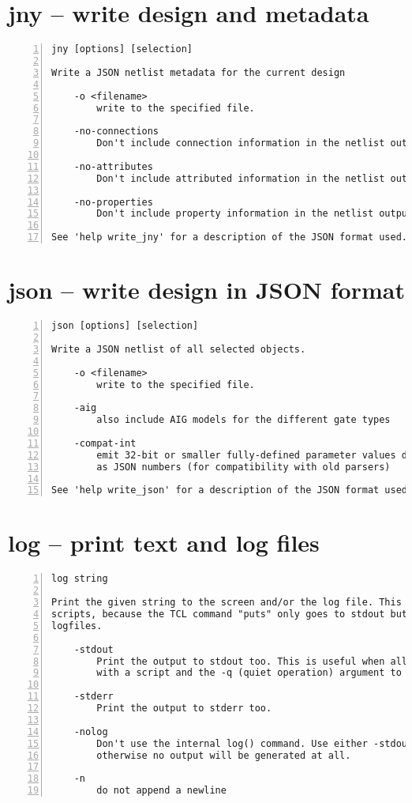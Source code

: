 \section{jny -- write design and metadata}
\label{cmd:jny}
\begin{lstlisting}[numbers=left,frame=single]
    jny [options] [selection]

Write a JSON netlist metadata for the current design

    -o <filename>
        write to the specified file.

    -no-connections
        Don't include connection information in the netlist output.

    -no-attributes
        Don't include attributed information in the netlist output.

    -no-properties
        Don't include property information in the netlist output.

See 'help write_jny' for a description of the JSON format used.
\end{lstlisting}

\section{json -- write design in JSON format}
\label{cmd:json}
\begin{lstlisting}[numbers=left,frame=single]
    json [options] [selection]

Write a JSON netlist of all selected objects.

    -o <filename>
        write to the specified file.

    -aig
        also include AIG models for the different gate types

    -compat-int
        emit 32-bit or smaller fully-defined parameter values directly
        as JSON numbers (for compatibility with old parsers)

See 'help write_json' for a description of the JSON format used.
\end{lstlisting}

\section{log -- print text and log files}
\label{cmd:log}
\begin{lstlisting}[numbers=left,frame=single]
    log string

Print the given string to the screen and/or the log file. This is useful for TCL
scripts, because the TCL command "puts" only goes to stdout but not to
logfiles.

    -stdout
        Print the output to stdout too. This is useful when all Yosys is executed
        with a script and the -q (quiet operation) argument to notify the user.

    -stderr
        Print the output to stderr too.

    -nolog
        Don't use the internal log() command. Use either -stdout or -stderr,
        otherwise no output will be generated at all.

    -n
        do not append a newline
\end{lstlisting}

